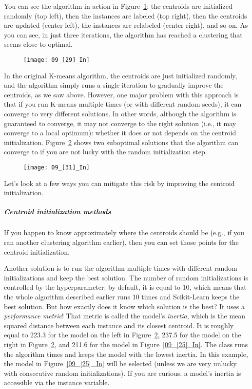 You can see the algorithm in action in Figure~\ref{09_[29]_In}: the centroids are initialized randomly (top left), then the instances are labeled (top right), then the centroids are updated (center left), the instances are relabeled (center right), and so on. As you can see, in just three iterations, the algorithm has reached a clustering that seems close to optimal.
\begin{figure}[h!t]
\centering
\texttt{[image: 09\_[29]\_In]}
\caption{}\label{09_[29]_In}
\end{figure}

In the original K-means algorithm, the centroids are just initialized randomly, and the algorithm simply runs a single iteration to gradually improve the centroids, as we saw above. However, one major problem with this approach is that if you run K-means multiple times (or with different random seeds), it can converge to very different solutions. In other words, although the algorithm is guaranteed to converge, it may not converge to the right solution (i.e., it may converge to a local optimum): whether it does or not depends on the centroid initialization. Figure~\ref{09_[31]_In} shows two suboptimal solutions that the algorithm can converge to if you are not lucky with the random initialization step.
\begin{figure}[h!t]
\centering
\texttt{[image: 09\_[31]\_In]}
\caption{}\label{09_[31]_In}
\end{figure}

Let's look at a few ways you can mitigate this risk by improving the centroid initialization.
\subparagraph{Centroid initialization methods}
If you happen to know approximately where the centroids should be (e.g., if you ran another clustering algorithm earlier), then you can set those points for the centroid initialization.

Another solution is to run the algorithm multiple times with different random initializations and keep the best solution. The number of random initializations is controlled by the  hyperparameter: by default, it is equal to 10, which means that the whole algorithm described earlier runs 10 times and Scikit-Learn keeps the best solution. But how exactly does it know which solution is the best? It uses a \emph{performance metric}! That metric is called the model's \emph{inertia}, which is the mean squared distance between each instance and its closest centroid. It is roughly equal to \num{223.3} for the model on the left in Figure~\ref{09_[31]_In}, \num{237.5} for the model on the right in Figure~\ref{09_[31]_In}, and \num{211.6} for the model in Figure~\ref{09_[25]_In}. The  class runs the algorithm  times and keeps the model with the lowest inertia. In this example, the model in Figure~\ref{09_[25]_In} will be selected (unless we are very unlucky with  consecutive random initializations). If you are curious, a model's inertia is accessible via the  instance variable.

